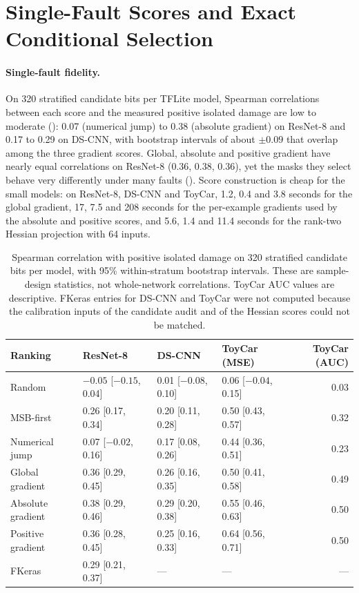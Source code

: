 \section{Single-Fault Scores and Exact Conditional Selection}\label{app:single}\label{app:evidence}\label{app:proofs}
\paragraph{Single-fault fidelity.} On 320 stratified candidate bits per TFLite model, Spearman correlations between each score and the measured positive isolated damage are low to moderate (): 0.07 (numerical jump) to 0.38 (absolute gradient) on ResNet-8 and 0.17 to 0.29 on DS-CNN, with bootstrap intervals of about $\pm0.09$ that overlap among the three gradient scores. Global, absolute and positive gradient have nearly equal correlations on ResNet-8 (0.36, 0.38, 0.36), yet the masks they select behave very differently under many faults (). Score construction is cheap for the small models: on ResNet-8, DS-CNN and ToyCar, 1.2, 0.4 and 3.8 seconds for the global gradient, 17, 7.5 and 208 seconds for the per-example gradients used by the absolute and positive scores, and 5.6, 1.4 and 11.4 seconds for the rank-two Hessian projection with 64 inputs.

\begin{table}[h]
\caption{Spearman correlation with positive isolated damage on 320 stratified candidate bits per model, with 95\% within-stratum bootstrap intervals. These are sample-design statistics, not whole-network correlations. ToyCar AUC values are descriptive. FKeras entries for DS-CNN and ToyCar were not computed because the calibration inputs of the candidate audit and of the Hessian scores could not be matched.}\label{tab:isolated}
\centering\small
\begin{tabular}{l l l l r}\toprule
Ranking & ResNet-8 & DS-CNN & ToyCar (MSE) & ToyCar (AUC)\\\midrule
Random & $-0.05$ [$-0.15$, 0.04] & 0.01 [$-0.08$, 0.10] & 0.06 [$-0.04$, 0.15] & 0.03\\
MSB-first & 0.26 [0.17, 0.34] & 0.20 [0.11, 0.28] & 0.50 [0.43, 0.57] & 0.32\\
Numerical jump & 0.07 [$-0.02$, 0.16] & 0.17 [0.08, 0.26] & 0.44 [0.36, 0.51] & 0.23\\
Global gradient & 0.36 [0.29, 0.45] & 0.26 [0.16, 0.35] & 0.50 [0.41, 0.58] & 0.49\\
Absolute gradient & 0.38 [0.29, 0.46] & 0.29 [0.20, 0.38] & 0.55 [0.46, 0.63] & 0.50\\
Positive gradient & 0.36 [0.28, 0.45] & 0.25 [0.16, 0.33] & 0.64 [0.56, 0.71] & 0.50\\
FKeras & 0.29 [0.21, 0.37] & --- & --- & ---\\\bottomrule
\end{tabular}
\end{table}

